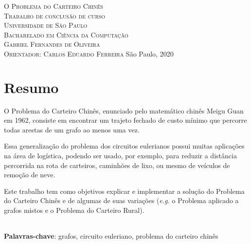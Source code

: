 \documentclass[12pt,twoside,english,brazilian]{book}
\begin{document}
\frontmatter

\pagestyle{plain}


\thispagestyle{empty}


\begin{center}
    \Large \textsc{O Problema do Carteiro Chinês} \\[120pt]
    \large \textsc{Trabalho de conclusão de curso} \\
    \large \textsc{Universidade de São Paulo} \\
    \large \textsc{Bacharelado em Ciência da Computação}\\[120pt]
    \large \textsc{Gabriel Fernandes de Oliveira} \\
    \large \textsc{Orientador: Carlos Eduardo Ferreira}
    \vfill
    \normalsize{São Paulo, 2020}
\end{center}



\chapter*{Resumo}

O Problema do Carteiro Chinês, enunciado pelo matemático chinês Meigu Guan em 1962, consiste em encontrar um trajeto fechado de custo mínimo que percorre todas arestas de um grafo ao menos uma vez.

Essa generalização do problema dos circuitos eulerianos possui muitas aplicações na área de logística, podendo ser usado, por exemplo, para reduzir a distância percorrida na rota de carteiros, caminhões de lixo, ou mesmo de veículos de remoção de neve.

Este trabalho tem como objetivos explicar e implementar a solução do Problema do Carteiro Chinês e de algumas de suas variações (\textit{e.g.} o Problema aplicado a grafos mistos e o Problema do Carteiro Rural).


\noindent \\ \textbf{Palavras-chave}: grafos, circuito euleriano, problema do carteiro chinês
\end{document}
